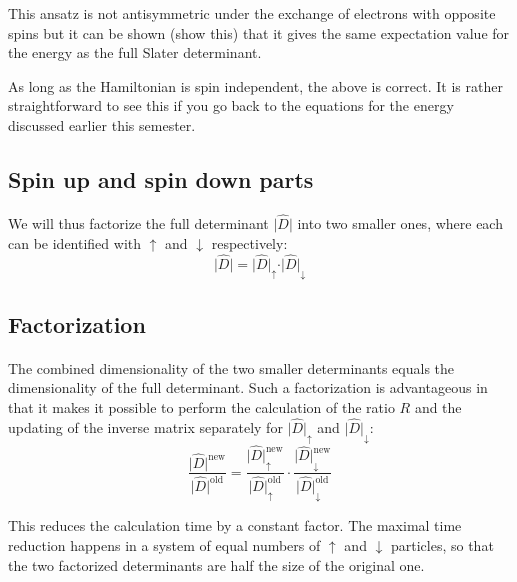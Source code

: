 \documentclass[%
twoside,                 %
final,                   %
10pt]{article}
\begin{document}
This ansatz is not antisymmetric under the exchange of electrons with  opposite spins but it can be shown (show this) that it gives the same
expectation value for the energy as the full Slater determinant.

As long as the Hamiltonian is spin independent, the above is correct. It is rather straightforward to see this if you go back to the equations for the energy discussed earlier  this semester.



\subsection*{Spin up and spin down parts}

\paragraph{}

We will thus
factorize the full determinant $\vert\hat{D}\vert$ into two smaller ones, where 
each can be identified with $\uparrow$ and $\downarrow$
respectively:
\[
\vert\hat{D}\vert = \vert\hat{D}\vert_\uparrow\cdot \vert\hat{D}\vert_\downarrow
\]



\subsection*{Factorization}

\paragraph{}
The combined dimensionality of the two smaller determinants equals the
dimensionality of the full determinant. Such a factorization is
advantageous in that it makes it possible to perform the calculation
of the ratio $R$ and the updating of the inverse matrix separately for
$\vert\hat{D}\vert_\uparrow$ and $\vert\hat{D}\vert_\downarrow$:
\[
\frac{\vert\hat{D}\vert^\mathrm{new}}{\vert\hat{D}\vert^\mathrm{old}} =
\frac{\vert\hat{D}\vert^\mathrm{new}_\uparrow}
{\vert\hat{D}\vert^\mathrm{old}_\uparrow}\cdot
\frac{\vert\hat{D}\vert^\mathrm{new}_\downarrow
}{\vert\hat{D}\vert^\mathrm{old}_\downarrow}
\]


This reduces the calculation time by a constant factor. The maximal
time reduction happens in a system of equal numbers of $\uparrow$ and
$\downarrow$ particles, so that the two factorized determinants are
half the size of the original one.
\end{document}
